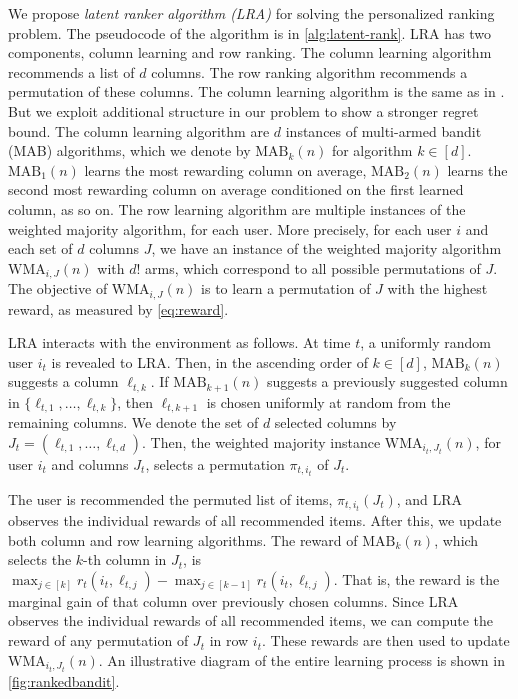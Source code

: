 
We propose \emph{latent ranker algorithm (LRA)} for solving the personalized ranking problem. The pseudocode of the algorithm is in \cref{alg:latent-rank}. LRA has two components, column learning and row ranking. The column learning algorithm recommends a list of $d$ columns. The row ranking algorithm recommends a permutation of these columns. The column learning algorithm is the same as in  \citet{radlinski2008learning}. But we exploit additional structure in our problem to show a stronger regret bound. The column learning algorithm are $d$ instances of multi-armed bandit (MAB) algorithms, which we denote by $\textrm{MAB}_k(n)$ for algorithm $k \in [d]$. $\textrm{MAB}_1(n)$ learns the most rewarding column on average, $\textrm{MAB}_2(n)$ learns the second most rewarding column on average conditioned on the first learned column, as so on. The row learning algorithm are multiple instances of the weighted majority algorithm, for each user. More precisely, for each user $i$ and each set of $d$ columns $J$, we have an instance of the weighted majority algorithm $\textrm{WMA}_{i, J}(n)$ with $d!$ arms, which correspond to all possible permutations of $J$. The objective of $\textrm{WMA}_{i, J}(n)$ is to learn a permutation of $J$ with the highest reward, as measured by \eqref{eq:reward}.

LRA interacts with the environment as follows. At time $t$, a uniformly random user $i_t$ is revealed to LRA. Then, in the ascending order of $k \in [d]$, $\textrm{MAB}_k(n)$ suggests a column $\ell_{t, k}$. If $\textrm{MAB}_{k + 1}(n)$ suggests a previously suggested column in $\{\ell_{t, 1}, \dots, \ell_{t, k}\}$, then $\ell_{t, k + 1}$ is chosen uniformly at random from the remaining columns. We denote the set of $d$ selected columns by $J_t = (\ell_{t, 1}, \dots, \ell_{t, d})$. Then, the weighted majority instance $\textrm{WMA}_{i_t, J_t}(n)$, for user $i_t$ and columns $J_t$, selects a permutation $\pi_{t, i_t}$ of $J_t$.

The user is recommended the permuted list of items, $\pi_{t, i_t}(J_t)$, and LRA observes the individual rewards of all recommended items. After this, we update both column and row learning algorithms. The reward of $\textrm{MAB}_k(n)$, which selects the $k$-th column in $J_t$, is $\max_{j \in [k]} r_t(i_t, \ell_{t, j}) - \max_{j \in [k - 1]} r_t(i_t, \ell_{t, j})$. That is, the reward is the marginal gain of that column over previously chosen columns. Since LRA observes the individual rewards of all recommended items, we can compute the reward of any permutation of $J_t$ in row $i_t$. These rewards are then used to update $\textrm{WMA}_{i_t, J_t}(n)$. An illustrative diagram of the entire learning process is shown in \cref{fig:rankedbandit}.

